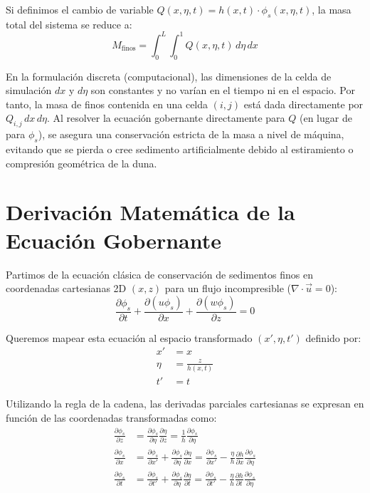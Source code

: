 \documentclass[11pt,a4paper]{article}
\begin{document}
Si definimos el cambio de variable $Q(x, \eta, t) = h(x,t) \cdot \phi_s(x, \eta, t)$, la masa total del sistema se reduce a:
\begin{equation}
    M_{\text{finos}} = \int_{0}^{L} \int_{0}^{1} Q(x, \eta, t) \, d\eta \, dx
\end{equation}

En la formulación discreta (computacional), las dimensiones de la celda de simulación $dx$ y $d\eta$ son constantes y no varían en el tiempo ni en el espacio. Por tanto, la masa de finos contenida en una celda $(i, j)$ está dada directamente por $Q_{i,j} \, dx \, d\eta$. Al resolver la ecuación gobernante directamente para $Q$ (en lugar de para $\phi_s$), se asegura una conservación estricta de la masa a nivel de máquina, evitando que se pierda o cree sedimento artificialmente debido al estiramiento o compresión geométrica de la duna.

\section{Derivación Matemática de la Ecuación Gobernante}
Partimos de la ecuación clásica de conservación de sedimentos finos en coordenadas cartesianas 2D $(x, z)$ para un flujo incompresible ($\nabla \cdot \vec{u} = 0$):
\begin{equation}
    \frac{\partial \phi_s}{\partial t} + \frac{\partial (u \phi_s)}{\partial x} + \frac{\partial (w \phi_s)}{\partial z} = 0
\end{equation}

Queremos mapear esta ecuación al espacio transformado $(x', \eta, t')$ definido por:
\begin{align}
    x' &= x \\
    \eta &= \frac{z}{h(x,t)} \\
    t' &= t
\end{align}

Utilizando la regla de la cadena, las derivadas parciales cartesianas se expresan en función de las coordenadas transformadas como:
\begin{align}
    \frac{\partial \phi_s}{\partial z} &= \frac{\partial \phi_s}{\partial \eta} \frac{\partial \eta}{\partial z} = \frac{1}{h} \frac{\partial \phi_s}{\partial \eta} \\
    \frac{\partial \phi_s}{\partial x} &= \frac{\partial \phi_s}{\partial x'} + \frac{\partial \phi_s}{\partial \eta} \frac{\partial \eta}{\partial x} = \frac{\partial \phi_s}{\partial x'} - \frac{\eta}{h} \frac{\partial h}{\partial x} \frac{\partial \phi_s}{\partial \eta} \\
    \frac{\partial \phi_s}{\partial t} &= \frac{\partial \phi_s}{\partial t'} + \frac{\partial \phi_s}{\partial \eta} \frac{\partial \eta}{\partial t} = \frac{\partial \phi_s}{\partial t'} - \frac{\eta}{h} \frac{\partial h}{\partial t} \frac{\partial \phi_s}{\partial \eta}
\end{align}
\end{document}

